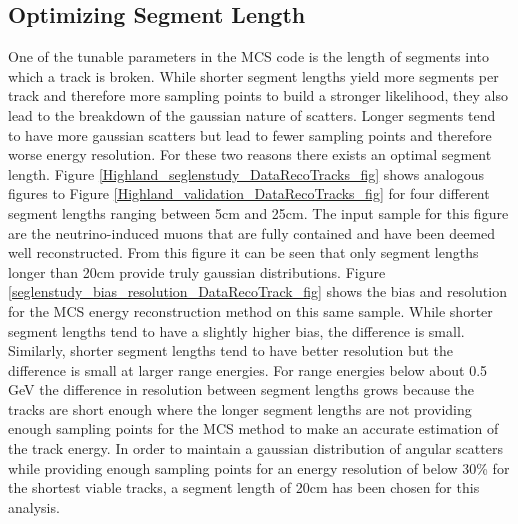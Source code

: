 \subsection{Optimizing Segment Length}\label{SegmentLength_DataRecoTrack_section}
One of the tunable parameters in the MCS code is the length of segments into which a track is broken. While shorter segment lengths yield more segments per track and therefore more sampling points to build a stronger likelihood, they also lead to the breakdown of the gaussian nature of scatters. Longer segments tend to have more gaussian scatters but lead to fewer sampling points and therefore worse energy resolution. For these two reasons there exists an optimal segment length. Figure \ref{Highland_seglenstudy_DataRecoTracks_fig} shows analogous figures to Figure \ref{Highland_validation_DataRecoTracks_fig} for four different segment lengths ranging between 5cm and 25cm. The input sample for this figure are the neutrino-induced muons that are fully contained and have been deemed well reconstructed. From this figure it can be seen that only segment lengths longer than 20cm provide truly gaussian distributions. Figure \ref{seglenstudy_bias_resolution_DataRecoTrack_fig} shows the bias and resolution for the MCS energy reconstruction method on this same sample. While shorter segment lengths tend to have a slightly higher bias, the difference is small. Similarly, shorter segment lengths tend to have better resolution but the difference is small at larger range energies. For range energies below about 0.5 GeV the difference in resolution between segment lengths grows because the tracks are short enough where the longer segment lengths are not providing enough sampling points for the MCS method to make an accurate estimation of the track energy. In order to maintain a gaussian distribution of angular scatters while providing enough sampling points for an energy resolution of below 30\% for the shortest viable tracks, a segment length of 20cm has been chosen for this analysis.

